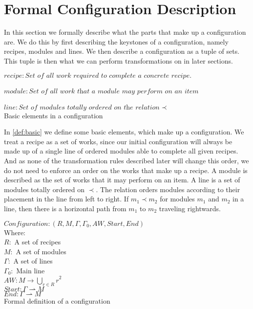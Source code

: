 \section{Formal Configuration Description} \label{sec:math_rules}
In this section we formally describe what the parts that make up a configuration are. We do this by first describing the keystones of a configuration, namely recipes, modules and lines. We then describe a configuration as a tuple of sets. This tuple is then what we can perform transformations on in later sections.

\begin{definition}[htb]
$recipe: \textit{Set of all work required to complete a concrete recipe.}$
\\ \\
$module: \textit{Set of all work that a module may perform on an item}$
\\ \\
$line: \textit{Set of modules totally ordered on the relation} \prec$
\\
\caption{Basic elements in a configuration}
\label{def:basic}
\end{definition}


In \cref{def:basic} we define some basic elements, which make up a configuration. We treat a recipe as a set of works, since our initial configuration will always be made up of a single line of ordered modules able to complete all given recipes. And as none of the transformation rules described later will change this order, we do not need to enforce an order on the works that make up a recipe. A module is described as the set of works that it may perform on an item. A line is a set of modules totally ordered on $\prec$. The relation orders modules according to their placement in the line from left to right. If $m_1 \prec m_2$ for modules $m_1$ and $m_2$ in a line, then there is a horizontal path from $m_1$ to $m_2$ traveling rightwards. 

\begin{definition}[htb]
$Configuration: (R, M , \Gamma, \Gamma_0, AW, Start, End)$
\\
Where: \\
$R:$ A set of recipes \\
$M:$ A set of modules \\
$\Gamma:$ A set of lines \\
$\Gamma_0:$ Main line \\
$AW: M \rightarrow {\bigcup_{r\in R}r}^2$ \\ 
$Start: \Gamma \rightharpoonup M$ \\
$End: \Gamma \rightharpoonup M$ \\
\caption{Formal definition of a configuration}
\label{def:config}
\end{definition}

